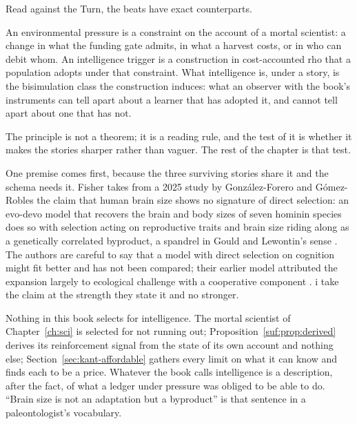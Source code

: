 Read against the Turn, the beats have exact counterparts.

\begin{principle}
\label{st:prin:schema}
An environmental pressure is a constraint on the account of a mortal scientist: a change in what the funding gate admits, in what a harvest costs, or in who can debit whom. An intelligence trigger is a construction in cost-accounted rho that a population adopts under that constraint. What intelligence is, under a story, is the bisimulation class the construction induces: what an observer with the book's instruments can tell apart about a learner that has adopted it, and cannot tell apart about one that has not.
\end{principle}

\noindent
The principle is not a theorem; it is a reading rule, and the test of it is whether it makes the stories sharper rather than vaguer. The rest of the chapter is that test.

One premise comes first, because the three surviving stories share it and the schema needs it. Fisher takes from a 2025 study by Gonz\'alez-Forero and G\'omez-Robles the claim that human brain size shows no signature of direct selection: an evo-devo model that recovers the brain and body sizes of seven hominin species does so with selection acting on reproductive traits and brain size riding along as a genetically correlated byproduct, a spandrel in Gould and Lewontin's sense \cite{gonzalezforero2024,gonzalezforero2025}. The authors are careful to say that a model with direct selection on cognition might fit better and has not been compared; their earlier model attributed the expansion largely to ecological challenge with a cooperative component \cite{gonzalezforero2018}. i take the claim at the strength they state it and no stronger.

\begin{observation}
\label{st:obs:byproduct}
Nothing in this book selects for intelligence. The mortal scientist of Chapter~\ref{ch:sci} is selected for not running out; Proposition~\ref{suf:prop:derived} derives its reinforcement signal from the state of its own account and nothing else; Section~\ref{sec:kant-affordable} gathers every limit on what it can know and finds each to be a price. Whatever the book calls intelligence is a description, after the fact, of what a ledger under pressure was obliged to be able to do. ``Brain size is not an adaptation but a byproduct'' is that sentence in a paleontologist's vocabulary.
\end{observation}

